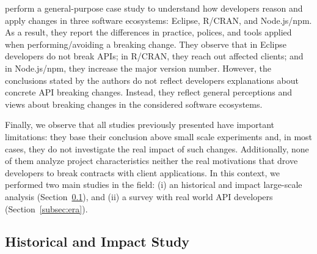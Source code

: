 \documentclass[11pt, a4paper]{article}
\begin{document}


\cite{thung16} perform a general-purpose case study to understand how developers reason and apply changes in three software ecosystems: Eclipse, R/CRAN, and Node.js/npm. 
As a result, they report the differences in practice, polices, and tools applied when performing/avoiding a breaking change.
They observe that in Eclipse developers do not break APIs; in R/CRAN, they reach out affected clients; and in Node.js/npm, they increase the major version number.
However, the conclusions stated by the authors do not reflect developers explanations about concrete API breaking changes. 
Instead, they reflect general perceptions and views about breaking changes in the considered software ecosystems.

Finally, we observe that all studies previously presented have important limitations: they base their conclusion above small scale experiments and, in most cases, they do not investigate the real impact of such changes.
Additionally, none of them analyze project characteristics neither the real motivations that drove developers to break contracts with client applications.
In this context, we performed two main studies in the field: 
(i) an historical and impact large-scale analysis (Section~\ref{subsec:saner}), and
(ii) a survey with real world API developers (Section~\ref{subsec:era}).

\subsection{Historical and Impact Study}
\label{subsec:saner}
\end{document}
